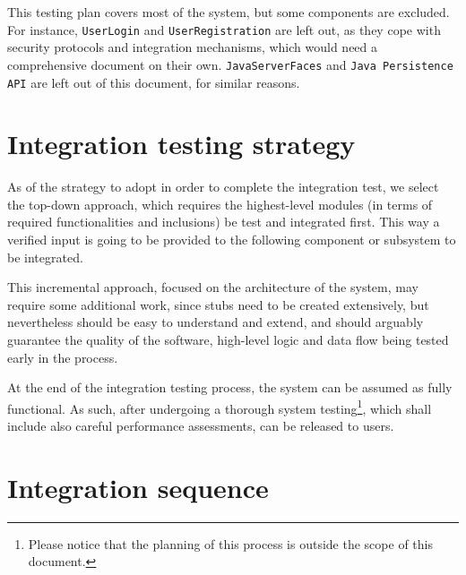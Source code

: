 This testing plan covers most of the system, but some components are excluded. For instance, \texttt{User\-Login} and \texttt{User\-Registration} are left out, as they cope with security protocols and integration mechanisms, which would need a comprehensive document on their own. \texttt{Java\-Server\-Faces} and \texttt{Java Persistence API} are left out of this document, for similar reasons.



\section{Integration testing strategy}\label{sec:strategy}
As of the strategy to adopt in order to complete the integration test, we select the \mbox{top-down} approach, which requires the \mbox{highest-level} modules (in terms of required functionalities and inclusions) be test and integrated first. This way a verified input is going to be provided to the following component or subsystem to be integrated.

This incremental approach, focused on the architecture of the system, may require some additional work, since stubs need to be created extensively, but nevertheless should be easy to understand and extend, and should arguably guarantee the quality of the software, \mbox{high-level} logic and data flow being tested early in the process.

At the end of the integration testing process, the system can be assumed as fully functional. As such, after undergoing a thorough system testing\footnote{Please notice that the planning of this process is outside the scope of this document.}, which shall include also careful performance assessments, can be released to users.





\section{Integration sequence}


